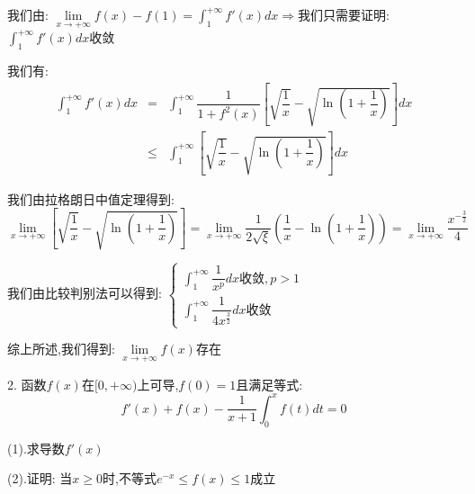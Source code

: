 \begin{solution}

	我们由:  $\lim\limits_{x\to +\infty}f(x)-f(1)=\int_{1}^{+\infty}f'(x)dx\Rightarrow $我们只需要证明:  $\int_{1}^{+\infty}f'(x)dx$收敛
	
	我们有:  
	\begin{eqnarray*}
		\int_{1}^{+\infty}f'(x)dx&=&\int_{1}^{+\infty}\dfrac{1}{1+f^{2}(x)}\left[\sqrt{\dfrac{1}{x}}-\sqrt{\ln(1+\dfrac{1}{x})} \right]dx\\
		&\leq&\int_{1}^{+\infty}\left[\sqrt{\dfrac{1}{x}}-\sqrt{\ln(1+\dfrac{1}{x})} \right]dx
	\end{eqnarray*}
	
	我们由拉格朗日中值定理得到:  
	$$\lim\limits_{x\to+\infty}\left[\sqrt{\dfrac{1}{x}}-\sqrt{\ln(1+\dfrac{1}{x})} \right]=\lim\limits_{x\to+\infty}\dfrac{1}{2\sqrt{\xi}}\left(\dfrac{1}{x}-\ln(1+\dfrac{1}{x}) \right)=\lim\limits_{x\to+\infty}\dfrac{x^{-\frac{3}{2}}}{4}$$
	
	我们由比较判别法可以得到:  $\left\lbrace 
	\begin{array}{l}
		\int_{1}^{+\infty}\dfrac{1}{x^p}dx\text{收敛},p>1\\
		\int_{1}^{+\infty}\dfrac{1}{4x^{\frac{3}{2}}}dx\text{收敛}
	\end{array}
	\right. $
	
	综上所述,我们得到:  $\lim\limits_{x\to +\infty}f(x)$存在
\end{solution}


2. 函数$f(x)$在$[0,+\infty)$上可导,$f(0)=1$且满足等式:  
$$f'(x)+f(x)-\dfrac{1}{x+1}\int_{0}^{x}f(t)dt=0$$

(1).求导数$f'(x)$

(2).证明:  当$x\geq 0$时,不等式$e^{-x}\leq f(x)\leq 1$成立


